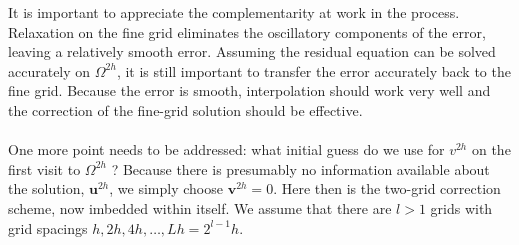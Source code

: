 \documentclass[11pt]{book}
\begin{document}
It is important to appreciate the complementarity at work in the process. Relaxation on the fine grid eliminates the oscillatory components of the error, leaving a relatively smooth error. Assuming the residual equation can be solved accurately on $\Omega^{2 h}$, it is still important to transfer the error accurately back to the fine grid. Because the error is smooth, interpolation should work very well and the correction of the fine-grid solution should be effective. \\ \\
One more point needs to be addressed: what initial guess do we use for $v^{2 h}$ on the first visit to $\Omega^{2 h}$ ? Because there is presumably no information available about the solution, $\mathbf{u}^{2 h}$, we simply choose $\mathbf{v}^{2 h}=0$. Here then is the two-grid correction scheme, now imbedded within itself. We assume that there are $l>1$ grids with grid spacings $h, 2 h, 4 h, \ldots, L h=2^{l-1} h$.
\end{document}
